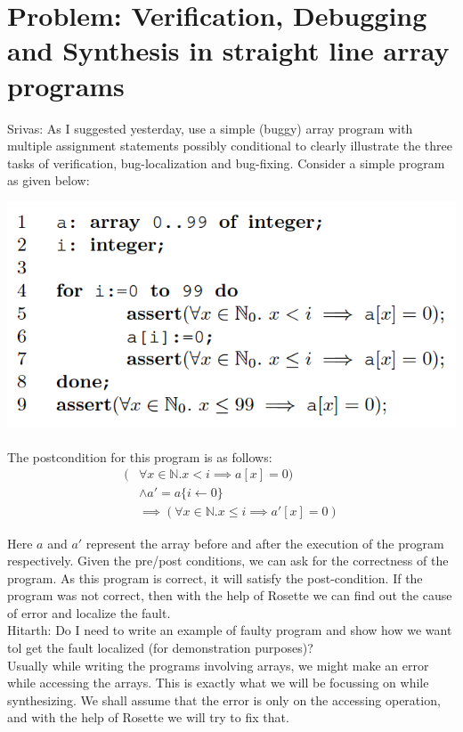 \documentclass[a4paper, 12pt, notitlepage] {article}
\newcommand{\mscmt}[1]{{\color{blue} \tiny{Srivas: {#1}}}}
\newcommand{\hcmt}[1]{{\color{magenta} \tiny{Hitarth: {#1}}}}
\begin{document}
\section {Problem: Verification, Debugging and Synthesis in straight line array programs}
\mscmt{As I suggested yesterday, use a simple (buggy) array program with multiple assignment statements possibly conditional to clearly illustrate the three tasks of verification, bug-localization and bug-fixing.}
Consider a simple program as given below:

\includegraphics[scale=0.6]{arrayprogex} \\
\\

The postcondition for this program is as follows:
\begin{equation}
\begin{split}
(&\forall{x \in \mathbb{N}} . x<i \implies a[x] = 0)  \\
	&\land a' = a\{i \leftarrow 0\} \\
	&\implies (\forall{x \in \mathbb{N}} . x \leq i \implies a'[x] = 0) 
\end{split}
\end{equation}

Here $a$ and $a'$ represent the array before and after the execution of the program respectively.
Given the pre/post conditions, we can ask for the correctness of the program. As this program is correct, it will satisfy the post-condition. If the program was not correct, then with the help of Rosette we can find out the cause of error and localize the fault. \\
\hcmt {Do I need to write an example of faulty program and show how we want tol get the fault localized (for demonstration purposes)?}
\\
Usually while writing the programs involving arrays, we might make an error while accessing the arrays. This is exactly what we will be focussing on while synthesizing. We shall assume that the error is only on the accessing operation, and with the help of Rosette we will try to fix that.\\\\
\end{document}

